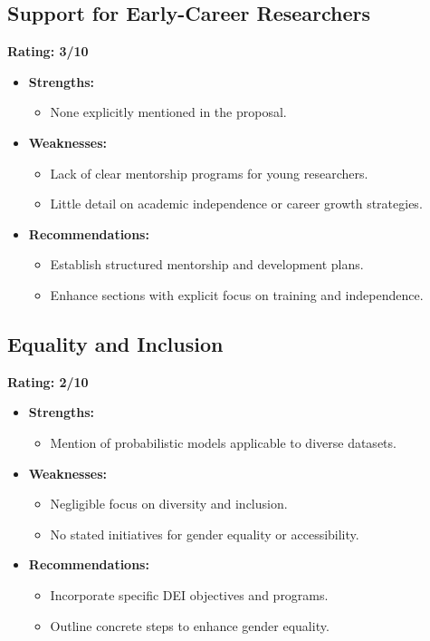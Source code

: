 \documentclass{article}
\begin{document}
\subsection{Support for Early-Career Researchers}
\textbf{Rating: 3/10}
\begin{itemize}
    \item \textbf{Strengths:}
        \begin{itemize}
            \item None explicitly mentioned in the proposal.
        \end{itemize}
    \item \textbf{Weaknesses:}
        \begin{itemize}
            \item Lack of clear mentorship programs for young researchers.
            \item Little detail on academic independence or career growth strategies.
        \end{itemize}
    \item \textbf{Recommendations:}
        \begin{itemize}
            \item Establish structured mentorship and development plans.
            \item Enhance sections with explicit focus on training and independence.
        \end{itemize}
\end{itemize}

\subsection{Equality and Inclusion}
\textbf{Rating: 2/10}
\begin{itemize}
    \item \textbf{Strengths:}
        \begin{itemize}
            \item Mention of probabilistic models applicable to diverse datasets.
        \end{itemize}
    \item \textbf{Weaknesses:}
        \begin{itemize}
            \item Negligible focus on diversity and inclusion.
            \item No stated initiatives for gender equality or accessibility.
        \end{itemize}
    \item \textbf{Recommendations:}
        \begin{itemize}
            \item Incorporate specific DEI objectives and programs.
            \item Outline concrete steps to enhance gender equality.
        \end{itemize}
\end{itemize}
\end{document}
